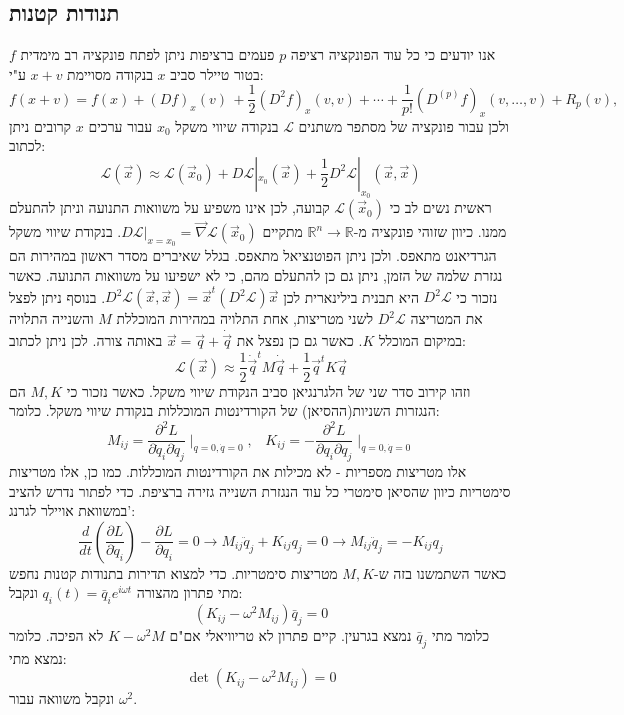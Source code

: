 \documentclass{tstextbook}
\begin{document}
\subsection{תנודות קטנות}

אנו יודעים כי כל עוד הפונקציה רציפה \(p\) פעמים ברציפות ניתן לפתח פונקציה רב מימדית \(f\) בטור טיילר סביב \(x\) בנקודה מסויימת \(x+v\) ע"י:
$$f(x+v)=f(x)+(D f)_{x}(v)\,+\frac{1}{2}(D^{2}f)_{x}(v,v)+\cdots+\frac{1}{p!}(D^{(p)}f)_{x}(v,\ldots,v)+R_{p}(v),$$
ולכן עבור פונקציה של מסתפר משתנים \(\mathcal{L}\) בנקודה שיווי משקל \(x_{0}\) עבור ערכים \(x\) קרובים ניתן לכתוב:
$$\mathcal{L}\left( \vec{x} \right) \approx  \mathcal{L}\left( \vec{x}_{0} \right)+D\mathcal{L} |_{x_{0}}\left( \vec{x} \right)+\frac{1}{2}D^2\mathcal{L} |_{x_{0}}\left( \vec{x},\vec{x} \right)  $$
ראשית נשים לב כי \(\mathcal{L}\left( \vec{x}_{0} \right)\) קבועה, לכן אינו משפיע על משוואות התנועה וניתן להתעלם ממנו.
כיוון שזוהי פונקציה מ-\(\mathbb{R} ^n\to \mathbb{R}\) מתקיים \(D\mathcal{L}|_{x=x_{0}}=\vec{\nabla} \mathcal{L}\left( \vec{x}_{0} \right)\). בנקודת שיווי משקל הגרדיאנט מתאפס. ולכן ניתן הפוטנציאל מתאפס. בגלל שאיברים מסדר ראשון במהירות הם נגזרת שלמה של הזמן, ניתן גם כן להתעלם מהם, כי לא ישפיעו על משוואות התנועה.
כאשר נזכור כי \(D^2\mathcal{L}\) היא תבנית בילינארית לכן \(D^2\mathcal{L} \left( \vec{x},\vec{x} \right)=\vec{x}^t \left( D^2\mathcal{L} \right)\vec{x}\). בנוסף ניתן לפצל את המטריצה \(D^2\mathcal{L}\) לשני מטריצות, אחת התלויה במהירות המוכללת \(M\) והשנייה התלויה במיקום המוכלל \(K\). כאשר גם כן נפצל את \(\vec{x}=\vec{q}+\dot{\vec{q}}\) באותה צורה. לכן ניתן לכתוב:
$$\mathcal{L} \left( \vec{x} \right)\approx \frac{1}{2}\dot{\vec{q}}^t M \dot{\vec{q}}+\frac{1}{2}\vec{q}^tK\vec{q}$$
וזהו קירוב סדר שני של הלגרנגיאן סביב הנקודת שיווי משקל. כאשר נזכור כי \(M,K\) הם הנגזרות השניות(ההסיאן) של הקורדינטות המוכללות בנקודת שיווי משקל. כלומר:
$$M_{i j}={\frac{\partial^{2}L}{\partial\dot{q}_{i}\partial\dot{q}_{j}}}\mid_{q=0,\dot{q}=0},\;\;\;K_{i j}=-{\frac{\partial^{2}L}{\partial q_{i}\partial q_{j}}}\mid_{q=0,\dot{q}=0}$$
אלו מטריצות מספריות - לא מכילות את הקורדינטות המוכללות. כמו כן, אלו מטריצות סימטריות כיוון שהסיאן סימטרי כל עוד הנגזרת השנייה גזירה ברציפת.
כדי לפתור נדרש להציב במשוואת אויילר לגרנג':
$$\frac{d}{d t}\left(\frac{\partial L}{\partial{\dot{q}}_{i}}\right)-\frac{\partial L}{\partial q_{i}}=0\rightarrow M_{i j}{\ddot{q}}_{j}+K_{i j}q_{j}=0\rightarrow M_{i j}{\ddot{q}}_{j}=-K_{i j}q_{j}$$
כאשר השתמשנו בזה ש-\(M,K\) מטריצות סימטריות. כדי למצוא תדירות בתנודות קטנות נחפש מתי פתרון מהצורה \(q_{i}(t)=\bar{q}_{i}e^{i\omega t}\) ונקבל:
$$\left(K_{i j}-\omega^{2}M_{i j}\right)\bar{q}_{j}=0$$
כלומר מתי \(\bar{q}_{j}\) נמצא בגרעין. קיים פתרון לא טריוויאלי אם"ם \(K-\omega^2M\) לא הפיכה. כלומר נמצא מתי:
$$\operatorname*{det}\left(K_{i j}-\omega^{2}M_{i j}\right)=0$$
ונקבל משוואה עבור \(\omega^2\). 
\end{document}
